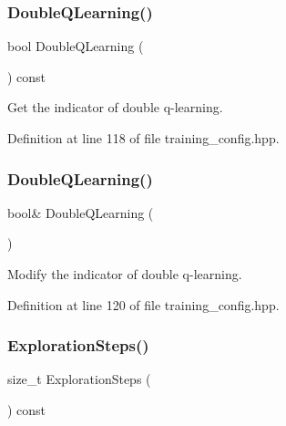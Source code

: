 \subsubsection{Double\+Q\+Learning()\hspace{0.1cm}{\footnotesize\ttfamily [1/2]}}
{\footnotesize\ttfamily bool Double\+Q\+Learning (\begin{DoxyParamCaption}{ }\end{DoxyParamCaption}) const\hspace{0.3cm}{\ttfamily [inline]}}



Get the indicator of double q-\/learning. 



Definition at line 118 of file training\+\_\+config.\+hpp.

\mbox{\label{classmlpack_1_1rl_1_1TrainingConfig_a5b1dece1cfbb6e22e8bfd35002bb0aa5}} 
\subsubsection{Double\+Q\+Learning()\hspace{0.1cm}{\footnotesize\ttfamily [2/2]}}
{\footnotesize\ttfamily bool\& Double\+Q\+Learning (\begin{DoxyParamCaption}{ }\end{DoxyParamCaption})\hspace{0.3cm}{\ttfamily [inline]}}



Modify the indicator of double q-\/learning. 



Definition at line 120 of file training\+\_\+config.\+hpp.

\mbox{\label{classmlpack_1_1rl_1_1TrainingConfig_a152e5eb946b9733ad6032403bae7cc85}} 
\subsubsection{Exploration\+Steps()\hspace{0.1cm}{\footnotesize\ttfamily [1/2]}}
{\footnotesize\ttfamily size\+\_\+t Exploration\+Steps (\begin{DoxyParamCaption}{ }\end{DoxyParamCaption}) const\hspace{0.3cm}{\ttfamily [inline]}}



